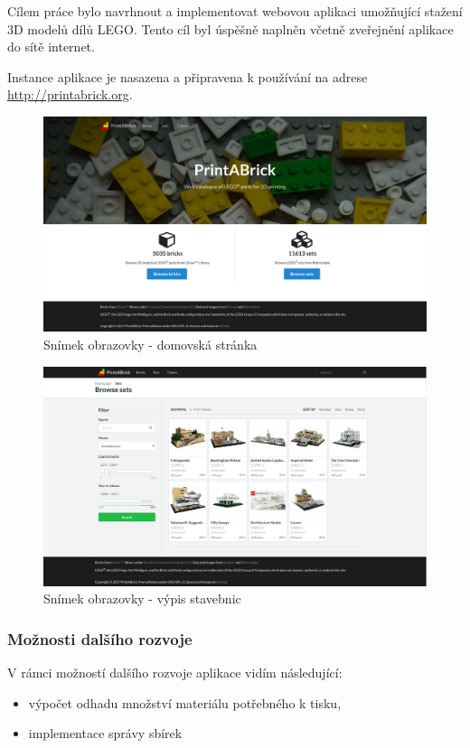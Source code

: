 Cílem práce bylo navrhnout a implementovat webovou aplikaci umožňující stažení 3D modelů dílů LEGO. Tento cíl byl úspěšně naplněn včetně zveřejnění aplikace do sítě internet. 

Instance aplikace je nasazena a připravena k používání na adrese \url{http://printabrick.org}. 


\begin{figure}[htbp]
    \centering
    \includegraphics[width=\textwidth,height=\textheight,keepaspectratio]{images/screenshot-homepage.png}
    \caption{Snímek obrazovky - domovská stránka\label{facebook-share}}
\end{figure}

\begin{figure}[htbp]
    \centering
    \includegraphics[width=\textwidth,height=\textheight,keepaspectratio]{images/screenshot-sets.png}
    \caption{Snímek obrazovky - výpis stavebnic\label{facebook-share}}
\end{figure}

\subsubsection*{Možnosti dalšího rozvoje}\label{moznosti-dalsiho-rozvoje}

V rámci možností dalšího rozvoje aplikace vidím následující:
\begin{itemize}
    \item výpočet odhadu množství materiálu potřebného k tisku,
    \item implementace správy sbírek 
\end{itemize} 
